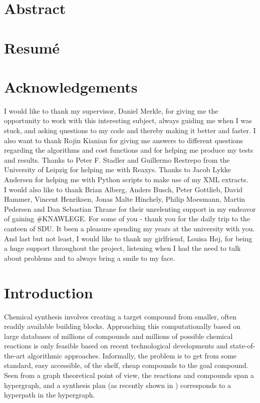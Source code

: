 \documentclass[a4paper,10pt,titlepage]{paper}
\begin{document}
\begin{titlepage}
\end{titlepage}

\vfill
\section*{Abstract}

\section*{Resumé}
\newpage

\tableofcontents
\newpage


\section{Acknowledgements}
I would like to thank my supervisor, Daniel Merkle, for giving me the opportunity to work with this interesting subject, always guiding me when I was stuck, and asking questions to my code and thereby making it better and faster. I also want to thank Rojin Kianian for giving me answers to different questions regarding the algorithms and cost functions and for helping me produce my tests and results. Thanks to Peter F. Stadler and Guillermo Restrepo from the University of Leipzig for helping me with Reaxys. Thanks to Jacob Lykke Andersen for helping me with Python scripts to make use of my XML extracts.\\
I would also like to thank Brian Alberg, Anders Busch, Peter Gottlieb, David Hammer, Vincent Henriksen, Jonas Malte Hinchely, Philip Moesmann, Martin Pedersen and Dan Sebastian Thrane for their unrelenting support in my endeavor of gaining \#KNAWLEGE. For some of you - thank you for the daily trip to the canteen of SDU. It been a pleasure spending my years at the university with you.\\
And last but not least, I would like to thank my girlfriend, Louisa Høj, for being a huge support throughout the project, listening when I had the need to talk about problems and to always bring a smile to my face.

\section{Introduction}
Chemical synthesis involves creating a target compound from smaller, often readily available building blocks. Approaching this computationally based on large databases of millions of compounds and millions of possible chemical reactions is only feasible based on recent technological developments and state-of-the-art algorithmic approaches. Informally, the problem is to get from some standard, easy accessible, of the shelf, cheap compounds to the goal compound. Seen from a graph theoretical point of view, the reactions and compounds span a hypergraph, and a synthesis plan (as recently shown in \cite{Fagerberg}) corresponds to a hyperpath in the hypergraph.
\end{document}
